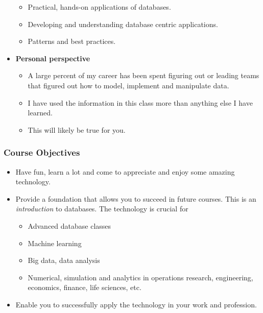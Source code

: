 \documentclass[11pt]{article}
\providecommand{\tightlist}{%
      \setlength{\itemsep}{0pt}\setlength{\parskip}{0pt}}
\begin{document}
\begin{itemize}
  \begin{itemize}
  \tightlist
  \item
    Practical, hands-on applications of databases.
  \item
    Developing and understanding database centric applications.
  \item
    Patterns and best practices.
  \end{itemize}
\item
   \textbf{Personal perspective}

  \begin{itemize}
  \tightlist
  \item
    A large percent of my career has been spent figuring out or leading
    teams that figured out how to model, implement and manipulate data.
  \item
    I have used the information in this class more than anything else I
    have learned.
  \item
    This will likely be true for you. 
  \end{itemize}
\end{itemize}

    \subsubsection{Course Objectives}\label{course-objectives}

\begin{itemize}
\item
  Have fun, learn a lot and come to appreciate and enjoy some amazing
  technology.
\item
  Provide a foundation that allows you to succeed in future courses.
  This is an \emph{introduction} to databases. The technology is crucial
  for

  \begin{itemize}
  \tightlist
  \item
    Advanced database classes
  \item
    Machine learning
  \item
    Big data, data analysis
  \item
    Numerical, simulation and analytics in operations research,
    engineering, economics, finance, life sciences, etc.
  \end{itemize}
\item
  Enable you to successfully apply the technology in your work and
  profession.
\end{itemize}
\end{document}
